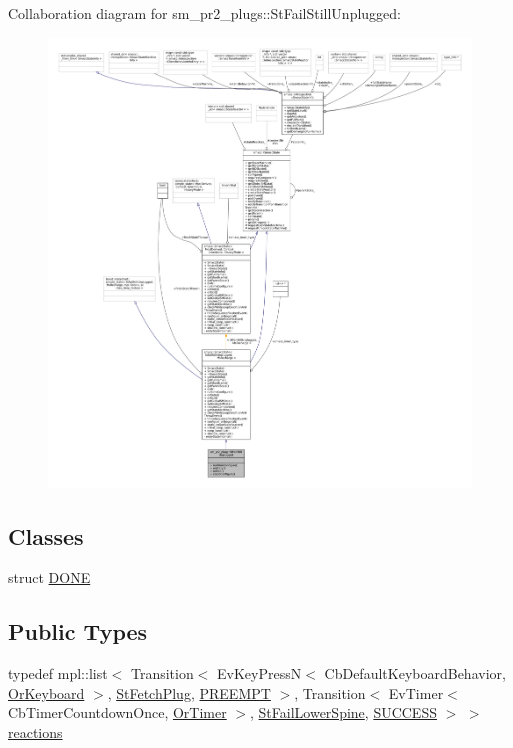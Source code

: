 Collaboration diagram for sm\+\_\+pr2\+\_\+plugs\+:\+:St\+Fail\+Still\+Unplugged\+:
\nopagebreak
\begin{figure}[H]
\begin{center}
\leavevmode
\includegraphics[width=350pt]{structsm__pr2__plugs_1_1StFailStillUnplugged__coll__graph}
\end{center}
\end{figure}
\subsection*{Classes}
\begin{DoxyCompactItemize}
\item 
struct \hyperlink{structsm__pr2__plugs_1_1StFailStillUnplugged_1_1DONE}{D\+O\+NE}
\end{DoxyCompactItemize}
\subsection*{Public Types}
\begin{DoxyCompactItemize}
\item 
typedef mpl\+::list$<$ Transition$<$ Ev\+Key\+PressN$<$ Cb\+Default\+Keyboard\+Behavior, \hyperlink{classsm__pr2__plugs_1_1OrKeyboard}{Or\+Keyboard} $>$, \hyperlink{structsm__pr2__plugs_1_1StFetchPlug}{St\+Fetch\+Plug}, \hyperlink{classPREEMPT}{P\+R\+E\+E\+M\+PT} $>$, Transition$<$ Ev\+Timer$<$ Cb\+Timer\+Countdown\+Once, \hyperlink{classsm__pr2__plugs_1_1OrTimer}{Or\+Timer} $>$, \hyperlink{structsm__pr2__plugs_1_1StFailLowerSpine}{St\+Fail\+Lower\+Spine}, \hyperlink{classSUCCESS}{S\+U\+C\+C\+E\+SS} $>$ $>$ \hyperlink{structsm__pr2__plugs_1_1StFailStillUnplugged_a58dc75afc3040293cac801248a1c999c}{reactions}
\end{DoxyCompactItemize}
